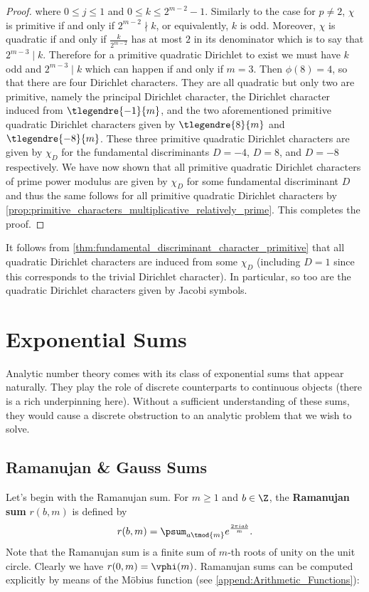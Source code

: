 \begin{proof}
      where $0 \le j \le 1$ and $0 \le k \le 2^{m-2}-1$. Similarly to the case for $p \neq 2$, $\chi$ is primitive if and only if $2^{m-2} \nmid k$, or equivalently, $k$ is odd. Moreover, $\chi$ is quadratic if and only if $\frac{k}{2^{m-2}}$ has at most $2$ in its denominator which is to say that $2^{m-3} \mid k$. Therefore for a primitive quadratic Dirichlet to exist we must have $k$ odd and $2^{m-3} \mid k$ which can happen if and only if $m = 3$. Then $\phi(8) = 4$, so that there are four Dirichlet characters. They are all quadratic but only two are primitive, namely the principal Dirichlet character, the Dirichlet character induced from $\tlegendre{-1}{m}$, and the two aforementioned primitive quadratic Dirichlet characters given by $\tlegendre{8}{m}$ and $\tlegendre{-8}{m}$. These three primitive quadratic Dirichlet characters are given by $\chi_{D}$ for the fundamental discriminants $D = -4$, $D = 8$, and $D = -8$ respectively. We have now shown that all primitive quadratic Dirichlet characters of prime power modulus are given by $\chi_{D}$ for some fundamental discriminant $D$ and thus the same follows for all primitive quadratic Dirichlet characters by \cref{prop:primitive_characters_multiplicative_relatively_prime}. This completes the proof.
    \end{proof}

    It follows from \cref{thm:fundamental_discriminant_character_primitive} that all quadratic Dirichlet characters are induced from some $\chi_{D}$ (including $D = 1$ since this corresponds to the trivial Dirichlet character). In particular, so too are the quadratic Dirichlet characters given by Jacobi symbols.
  \section{Exponential Sums}
    Analytic number theory comes with its class of exponential sums that appear naturally. They play the role of discrete counterparts to continuous objects (there is a rich underpinning here). Without a sufficient understanding of these sums, they would cause a discrete obstruction to an analytic problem that we wish to solve.
    \subsection*{Ramanujan \& Gauss Sums}
      Let's begin with the Ramanujan sum. For $m \ge 1$ and $b \in \Z$, the \textbf{Ramanujan sum} $r(b,m)$ is defined by
      \[
        r(b,m) = \psum_{a \tmod{m}}e^{\frac{2\pi iab}{m}}.
      \]
      Note that the Ramanujan sum is a finite sum of $m$-th roots of unity on the unit circle. Clearly we have $r(0,m) = \vphi(m)$. Ramanujan sums can be computed explicitly by means of the M\"obius function (see \cref{append:Arithmetic_Functions}):

